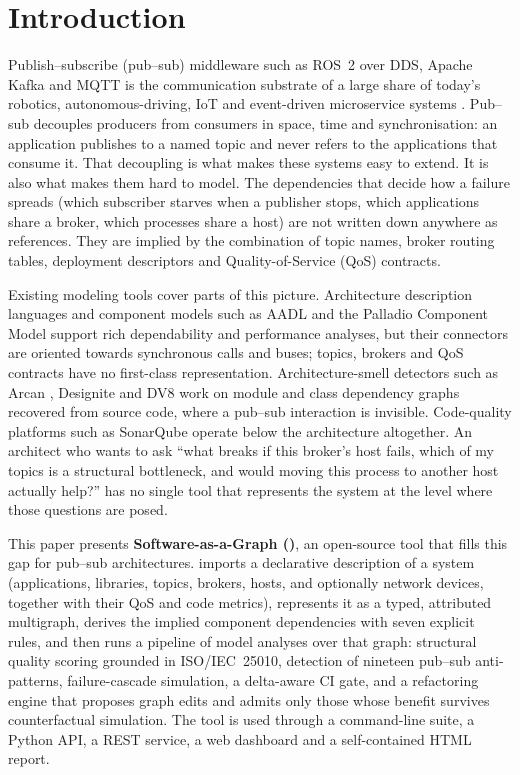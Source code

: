 \section{Introduction}
\label{sec:introduction}

Publish--subscribe (pub--sub) middleware such as ROS~2 over DDS, Apache Kafka and MQTT is the communication substrate of a large share of today's robotics, autonomous-driving, IoT and event-driven microservice systems \citep{wang2015building, pallickara2007fault, lee2025dependency}. Pub--sub decouples producers from consumers in space, time and synchronisation: an application publishes to a named topic and never refers to the applications that consume it. That decoupling is what makes these systems easy to extend. It is also what makes them hard to model. The dependencies that decide how a failure spreads (which subscriber starves when a publisher stops, which applications share a broker, which processes share a host) are not written down anywhere as references. They are implied by the combination of topic names, broker routing tables, deployment descriptors and Quality-of-Service (QoS) contracts.

Existing modeling tools cover parts of this picture. Architecture description languages and component models such as AADL \citep{feiler2006aadl} and the Palladio Component Model \citep{becker2009palladio} support rich dependability and performance analyses, but their connectors are oriented towards synchronous calls and buses; topics, brokers and QoS contracts have no first-class representation. Architecture-smell detectors such as Arcan \citep{arcan2017}, Designite \citep{sharma2016designite} and DV8 \citep{cai2019dv8} work on module and class dependency graphs recovered from source code, where a pub--sub interaction is invisible. Code-quality platforms such as SonarQube operate below the architecture altogether. An architect who wants to ask ``what breaks if this broker's host fails, which of my topics is a structural bottleneck, and would moving this process to another host actually help?'' has no single tool that represents the system at the level where those questions are posed.

This paper presents \textbf{Software-as-a-Graph (\sag{})}, an open-source tool that fills this gap for pub--sub architectures. \sag{} imports a declarative description of a system (applications, libraries, topics, brokers, hosts, and optionally network devices, together with their QoS and code metrics), represents it as a typed, attributed multigraph, derives the implied component dependencies with seven explicit rules, and then runs a pipeline of model analyses over that graph: structural quality scoring grounded in ISO/IEC~25010, detection of nineteen pub--sub anti-patterns, failure-cascade simulation, a delta-aware CI gate, and a refactoring engine that proposes graph edits and admits only those whose benefit survives counterfactual simulation. The tool is used through a command-line suite, a Python API, a REST service, a web dashboard and a self-contained HTML report.

